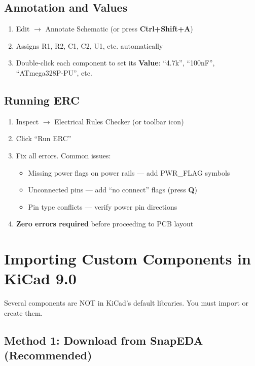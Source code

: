 \documentclass[a4paper,11pt]{article}
\renewcommand*{\,}{ }%
\begin{document}
\subsection{Annotation and Values}

\begin{enumerate}
    \item Edit $\rightarrow$ Annotate Schematic (or press \textbf{Ctrl+Shift+A})
    \item Assigns R1, R2, C1, C2, U1, etc. automatically
    \item Double-click each component to set its \textbf{Value}: ``4.7k'', ``100nF'', ``ATmega328P-PU'', etc.
\end{enumerate}

\subsection{Running ERC}

\begin{enumerate}
    \item Inspect $\rightarrow$ Electrical Rules Checker (or toolbar icon)
    \item Click ``Run ERC''
    \item Fix all errors. Common issues:
    \begin{itemize}[noitemsep]
        \item Missing power flags on power rails --- add PWR\_FLAG symbols
        \item Unconnected pins --- add ``no connect'' flags (press \textbf{Q})
        \item Pin type conflicts --- verify power pin directions
    \end{itemize}
    \item \textbf{Zero errors required} before proceeding to PCB layout
\end{enumerate}

\section{Importing Custom Components in KiCad 9.0}
\label{sec:import}

Several components are NOT in KiCad's default libraries. You must import or create them.

\subsection{Method 1: Download from SnapEDA (Recommended)}
\end{document}
